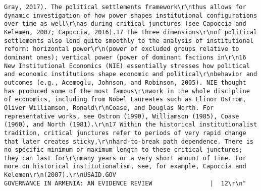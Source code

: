 \documentclass[
]{article}
\begin{document}
\begin{verbatim}
Gray, 2017). The political settlements framework\r\nthus allows for dynamic investigation of how power shapes institutional configurations over time as well\r\nas during critical junctures (see Capoccia and Kelemen, 2007; Capoccia, 2016).17 The three dimensions\r\nof political settlements also lend quite smoothly to the analysis of institutional reform: horizontal power\r\n(power of excluded groups relative to dominant ones); vertical power (power of dominant factions in\r\n16 New Institutional Economics (NIE) essentially stresses how political and economic institutions shape economic and political\r\nbehavior and outcomes (e.g., Acemoglu, Johnson, and Robinson, 2005). NIE thought has produced some of the most famous\r\nwork in the whole discipline of economics, including from Nobel Laureates such as Elinor Ostrom, Oliver Williamson, Ronald\r\nCoase, and Douglas North. For representative works, see Ostrom (1990), Williamson (1985), Coase (1960), and North (1981).\r\n17 Within the historical institutionalist tradition, critical junctures refer to periods of very rapid change that later creates sticky,\r\nhard-to-break path dependence. There is no specific minimum or maximum length to these critical junctures; they can last for\r\nmany years or a very short amount of time. For more on historical institutionalism, see, for example, Capoccia and Kelemen\r\n(2007).\r\nUSAID.GOV                                                                 GOVERNANCE IN ARMENIA: AN EVIDENCE REVIEW                |  12\r\n"                                                                                                                                                                                               

\end{verbatim}
\end{document}

